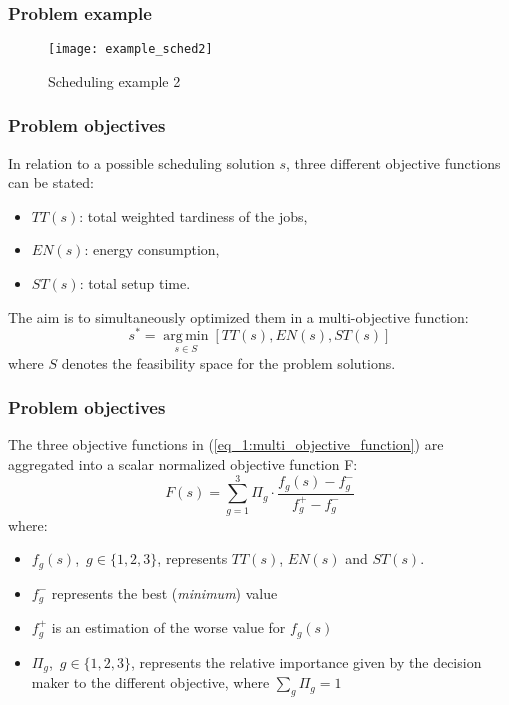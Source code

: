 \begin{frame} \frametitle{Problem example}
\begin{figure}[t]
	\label{fig:example_sched2}
	\centering
	\texttt{[image: example\_sched2]}
	\caption{Scheduling example 2}
\end{figure}
\end{frame}

\begin{frame} \frametitle{Problem objectives}
In relation to a possible scheduling solution $s$, three different objective functions can be stated:
\begin{itemize}
\item $TT(s)$: total weighted tardiness of the jobs,
\item $EN(s)$: energy consumption,
\item $ST(s)$: total setup time.
\end{itemize} 
The aim is to simultaneously optimized them in a multi-objective function:
\begin{equation}
\label{eq_1:multi_objective_function}
s^* = \operatorname*{arg\,min}_{s \in S} [TT(s),EN(s),ST(s)] 
\end{equation}
where $S$ denotes the feasibility space for the problem solutions.

\end{frame}


\begin{frame}
\frametitle{Problem objectives}

The three objective functions in (\ref{eq_1:multi_objective_function}) are aggregated into a scalar normalized objective function F:
\begin{equation}
\label{eq_2:normalized_multi_objective_function}
F(s) = \displaystyle\sum_{g=1}^{3} \Pi_{g} \cdot \frac{f_g(s) - f^{-}_{g}}{f^{+}_{g} - f^{-}_{g}}
\end{equation}
where:
\begin{itemize}
\item $f_g(s)$,~$g\in\{1,2,3\}$, represents $TT(s)$, $EN(s)$ and $ST(s)$.

\item $f^{-}_{g}$ represents the best (\emph{minimum}) value %
\item $f^{+}_{g}$ is an estimation of the worse value for $f_{g}(s)$%
\item $\Pi_{g}$,~$g\in\{1,2,3\}$, represents the relative importance given by the decision maker to the different objective, where $\sum_{g}\Pi_{g} = 1$
\end{itemize}

\end{frame}